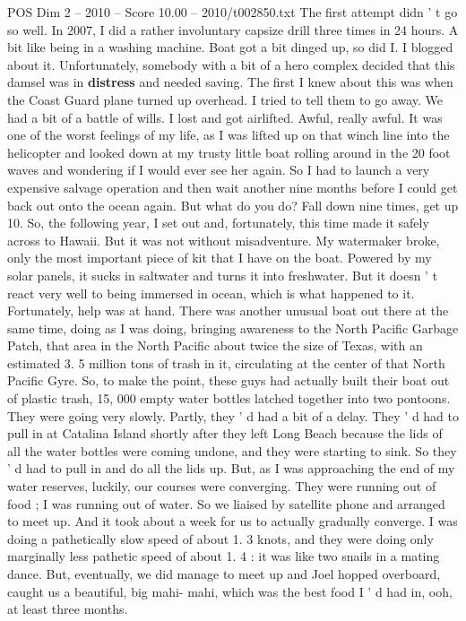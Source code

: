 \begin{textsample}{POS Dim 2 – 2010 – Score 10.00 – 2010/t002850.txt}
The first attempt didn ' t go so well.
In 2007, I did a rather involuntary capsize drill three times in 24 hours.
A bit like being in a washing machine.
Boat got a bit dinged up, so did I.
I blogged about it.
Unfortunately, somebody with a bit of a hero complex decided that this damsel was in \textbf{distress} and needed saving.
The first I knew about this was when the Coast Guard plane turned up overhead.
I tried to tell them to go away.
We had a bit of a battle of wills.
I lost and got airlifted.
Awful, really awful.
It was one of the worst feelings of my life, as I was lifted up on that winch line into the helicopter and looked down at my trusty little boat rolling around in the 20 foot waves and wondering if I would ever see her again.
So I had to launch a very expensive salvage operation and then wait another nine months before I could get back out onto the ocean again.
But what do you do?
Fall down nine times, get up 10.
So, the following year, I set out and, fortunately, this time made it safely across to Hawaii.
But it was not without misadventure.
My watermaker broke, only the most important piece of kit that I have on the boat.
Powered by my solar panels, it sucks in saltwater and turns it into freshwater.
But it doesn ' t react very well to being immersed in ocean, which is what happened to it.
Fortunately, help was at hand.
There was another unusual boat out there at the same time, doing as I was doing, bringing awareness to the North Pacific Garbage Patch, that area in the North Pacific about twice the size of Texas, with an estimated 3. 5 million tons of trash in it, circulating at the center of that North Pacific Gyre.
So, to make the point, these guys had actually built their boat out of plastic trash, 15, 000 empty water bottles latched together into two pontoons.
They were going very slowly.
Partly, they ' d had a bit of a delay.
They ' d had to pull in at Catalina Island shortly after they left Long Beach because the lids of all the water bottles were coming undone, and they were starting to sink.
So they ' d had to pull in and do all the lids up.
But, as I was approaching the end of my water reserves, luckily, our courses were converging.
They were running out of food ; I was running out of water.
So we liaised by satellite phone and arranged to meet up.
And it took about a week for us to actually gradually converge.
I was doing a pathetically slow speed of about 1. 3 knots, and they were doing only marginally less pathetic speed of about 1. 4 : it was like two snails in a mating dance.
But, eventually, we did manage to meet up and Joel hopped overboard, caught us a beautiful, big mahi- mahi, which was the best food I ' d had in, ooh, at least three months.

\end{textsample}
